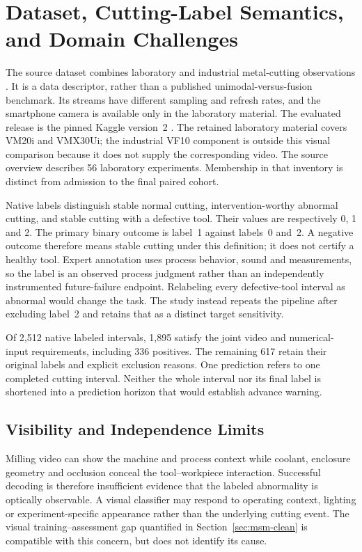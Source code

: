 \section{Dataset, Cutting-Label Semantics, and Domain Challenges}
The source dataset combines laboratory and industrial metal-cutting observations
\citep{Kim2026MSM}. It is a data descriptor, rather than a published
unimodal-versus-fusion benchmark. Its streams have different sampling and refresh rates,
and the smartphone camera is available only in the laboratory material. The evaluated
release is the pinned Kaggle version~2 \citep{MSMKaggle2025}. The retained laboratory
material covers VM20i and VMX30Ui; the industrial VF10 component is outside this visual
comparison because it does not supply the corresponding video. The source overview
describes 56 laboratory experiments. Membership in that inventory is distinct from
admission to the final paired cohort.

Native labels distinguish stable normal cutting, intervention-worthy abnormal cutting,
and stable cutting with a defective tool. Their values are respectively 0, 1 and 2. The
primary binary outcome is label~1 against labels~0 and~2. A negative outcome therefore
means stable cutting under this definition; it does not certify a healthy tool. Expert
annotation uses process behavior, sound and measurements, so the label is an observed
process judgment rather than an independently instrumented future-failure endpoint.
Relabeling every defective-tool interval as abnormal would change the task. The study
instead repeats the pipeline after excluding label~2 and retains that as a distinct
target sensitivity.

Of 2,512 native labeled intervals, 1,895 satisfy the joint video and numerical-input
requirements, including 336 positives. The remaining 617 retain their original labels
and explicit exclusion reasons. One prediction refers to one completed cutting interval.
Neither the whole interval nor its final label is shortened into a prediction horizon
that would establish advance warning.

\subsection{Visibility and Independence Limits}
Milling video can show the machine and process context while coolant, enclosure geometry
and occlusion conceal the tool--workpiece interaction. Successful decoding is therefore
insufficient evidence that the labeled abnormality is optically observable. A visual
classifier may respond to operating context, lighting or experiment-specific appearance
rather than the underlying cutting event. The visual training--assessment
gap quantified in Section~\ref{sec:msm-clean} is compatible with this concern, but does not identify its cause.

